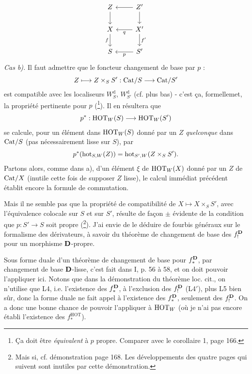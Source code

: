 \noindent{}%
\[
\begin{tikzcd}
Z \arrow[d] & Z' \arrow[l] \arrow[d] \\
X \arrow[d, "f"'] & X' \arrow[l, "q"] \arrow[d, "f'"] \\
S & S' \arrow[l, "p"]
\end{tikzcd}
\]
\textit{Cas b).} Il faut admettre que le foncteur changement de base par $p$ :
\[
Z \longmapsto Z \times_S S' : \mathrm{Cat}/S \longrightarrow \mathrm{Cat}/S'
\]
est compatible avec les localiseurs $W^{\mathrm{d}}_{S}$, $W^{\mathrm{d}}_{S'}$ (cf. plus bas) - c'est ça, formellemet, la propriété pertinente pour $p$ (\footnote[79]{Ça doit être \textit{équivalent} à $p$ propre. Comparer avec le corollaire 1, page 166.}). Il en résultera que %
\[
p^* : \mathrm{HOT}_W(S) \longrightarrow \mathrm{HOT}_W(S')
\]
se calcule, pour un élément dans $\mathrm{HOT}_W(S)$ donné par un $Z$ \textit{quelconque} dans $\mathrm{Cat}/S$ (pas nécessairement lisse sur $S$), par
\[
p^*(\mathrm{hot}_{S,W}(Z)) = \mathrm{hot}_{S',W}(Z \times_S S').
\]
Partons alors, comme dans a), d'un élément $\xi$ de $\mathrm{HOT}_W(X)$ donné par un $Z$ de $\mathrm{Cat}/X$ (inutile cette fois de supposer $Z$ lisse), le calcul immédiat précédent établit encore la formule de commutation.

Mais il ne semble pas que la propriété de compatibilité de $X \longmapsto X \times_S S'$, avec l'équivalence colocale sur $S$ et sur $S'$, résulte de façon $\pm$ évidente de la condition que $p : S' \longrightarrow S$ soit propre (\footnote[80]{Mais si, cf. démonstration page 168. Les développements des quatre pages qui suivent sont inutiles par cette démonstration.}). J'ai envie de le déduire de fourbis généraux sur le formalisme des dérivateurs, à savoir du théorème de changement de base des $f_!^{\mathbf{D}}$ pour un morphisme $\mathbf{D}$-propre.

Sous forme duale d'un théorème de changement de base pour $f_*^{\mathbf{D}}$, par changement de base $\mathbf{D}$-lisse, c'est fait dans I, p. 56 à 58, et on doit pouvoir l'appliquer ici. Notons que dans la démonstration du théorème loc. cit., on n'utilise que L4, i.e. l'existence des $f_*^{\mathbf{D}}$, à l'exclusion des $f_!^{\mathbf{D}}$ (L4$'$), plus L5 bien sûr, donc la forme duale ne fait appel à l'existence des $f_*^{\mathbf{D}}$, seulement des $f_!^{\mathbf{D}}$. On a donc une bonne chance de pouvoir l'appliquer à $\mathrm{HOT}_W$ (où je n'ai pas encore établi l'existence des $f_*^{\mathrm{HOT}}$). %

